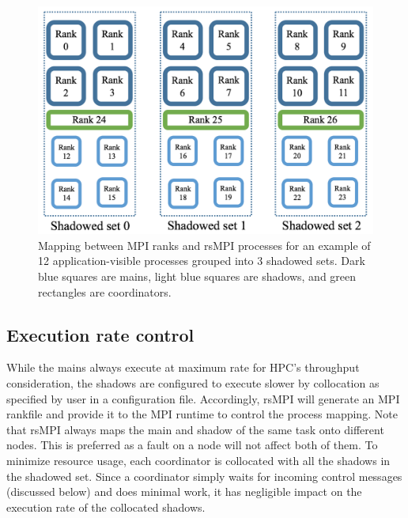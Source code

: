 \begin{figure}[!t]
  \begin{center}
      \includegraphics[width=\columnwidth]{figures/mapping}
  \end{center}
  \caption{Mapping between MPI ranks and rsMPI processes for an example of 12 application-visible processes grouped into 3 shadowed sets. Dark blue squares are mains, light blue squares are shadows, and green rectangles are coordinators.}
  \label{fig:mapping}
\end{figure}

\subsection{Execution rate control}
\label{sec:rate_control}
While the mains always execute at maximum rate for HPC's throughput consideration, the shadows are configured to execute slower by collocation as specified by user in a configuration file. Accordingly, rsMPI will generate an MPI rankfile and provide it to the MPI runtime to control the process mapping. Note that rsMPI always maps the main and shadow of the same task onto different nodes. This is preferred as a fault on a node will not affect both of them. 
To minimize resource usage, each coordinator is collocated with all the shadows in the shadowed set. Since a coordinator simply waits for incoming control messages (discussed below) and does minimal work, it has negligible impact on the execution rate of the collocated shadows. 


